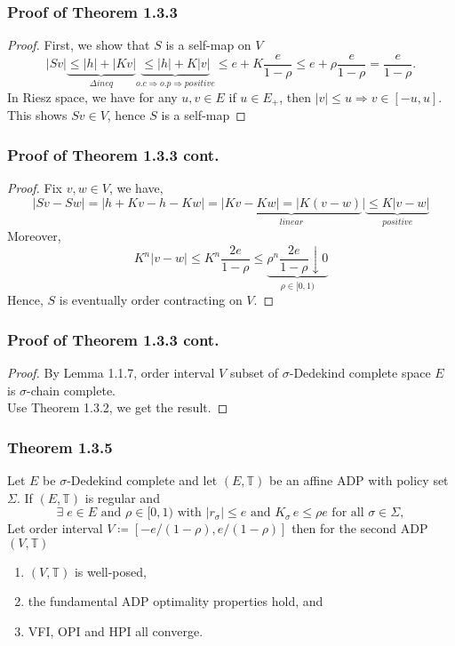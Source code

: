 \documentclass[11pt,xcolor={dvipsnames},hyperref={pdftex,pdfpagemode=UseNone,hidelinks,pdfdisplaydoctitle=true},usepdftitle=false]{beamer}
\begin{document}
\begin{frame}
\frametitle{Proof of Theorem 1.3.3}
\begin{proof}
First, we show that $S$ is a self-map on $V$
$$
|Sv| \underbrace{\leq |h| + |K v|}_{\Delta ineq}
       \underbrace{ \leq |h| + K|v| }_{o.c\Rightarrow o.p\Rightarrow positive}
        \leq e + K \frac{e}{1-\rho} 
        \leq e + \rho \frac{e}{1-\rho} 
        = \frac{e}{1-\rho}.
$$
In Riesz space, we have for any $u,v\in E$ if $u\in E_+$, then $|v|\le u\Rightarrow v\in[-u,u]$. This shows $Sv\in V$, hence $S$ is a self-map
\end{proof}
\end{frame}
\begin{frame}
\frametitle{Proof of Theorem 1.3.3 cont.}
\begin{proof}
Fix $v,w\in V$, we have,
$$
|Sv-Sw|  = |h+Kv-h-Kw|= \underbrace{|Kv-Kw|=|K(v-w)}_{linear}|\underbrace{\le K|v-w|}_{positive}
$$
Moreover, 
$$
K^n|v-w|\le K^n\frac{2e}{1-\rho}\le \underbrace{\rho^n\frac{2e}{1-\rho}\downarrow 0}_{\rho\in[0,1)}
$$
Hence, $S$ is eventually order contracting on $V$.
\end{proof}
\end{frame}
\begin{frame}
\frametitle{Proof of Theorem 1.3.3 cont.}
\begin{proof}
By Lemma 1.1.7, order interval $V$ subset of $\sigma$-Dedekind complete space $E$ is $\sigma$-chain complete.\\
Use Theorem 1.3.2, we get the result.
\end{proof}
\end{frame}
\begin{frame}
\frametitle{Theorem 1.3.5}
Let $E$ be $\sigma$-Dedekind complete and let $(E, \mathbb{T})$ be an
    affine ADP with policy set $\Sigma$.  If $(E,  \mathbb{T})$ is regular and
    \begin{equation*}
        \text{$\exists \; e \in E$ and $\rho \in [0, 1)$ with $|r_\sigma| \leq e$ and
            $K_\sigma \, e \leq \rho e$ for all $\sigma \in \Sigma$},     
    \end{equation*}
    Let order interval $V \coloneq
    [-e/(1-\rho), e/(1-\rho)]$
    then for the second ADP $(V,\mathbb{T})$
    \vspace{0.4em}
    \begin{enumerate}
        \item $(V,  \mathbb{T})$ is well-posed,
        \item the fundamental ADP optimality properties hold, and
        \item VFI, OPI and HPI all converge.  
    \end{enumerate}
\end{frame}
\end{document}
